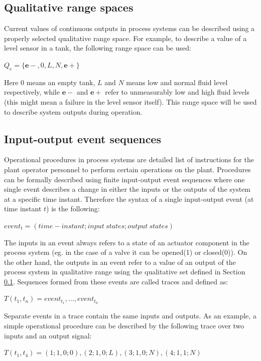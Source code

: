 \documentclass[conference]{IEEEtran}
\begin{document}
\subsection{Qualitative range spaces}
\label{sec:qualrngspc}
Current values of continuous outputs in process systems can be described using a properly selected qualitative range space. For example, to describe a value of a level sensor in a tank, the following range space can be used:

$Q_e=\{\mathbf{e-},0,L,N,\mathbf{e+}\}$

Here $0$ means an empty tank, $L$ and $N$ means low and normal fluid level respectively, while $\mathbf{e-}$ and $\mathbf{e+}$ refer to unmeasurably low and high fluid levels (this might mean a failure in the level sensor itself). This range space will be used to describe system outputs during operation.

\subsection{Input-output event sequences}
\label{sec:ioseq}

Operational procedures in process systems are detailed list of instructions for the plant operator personnel to perform certain operations on the plant. Procedures can be formally described using finite input-output event sequences where one single event describes a change in either the inputs or the outputs of the system at a specific time instant. Therefore the syntax of a single input-output event (at time instant $t$) is the following:

$event_t=(time-instant;{input~states};{output~states})$

The inputs in an event always refers to a state of an actuator component in the process system (eg. in the case of a valve it can be opened(1) or closed(0)). On the other hand, the outputs in an event refer to a value of an output of the process system in qualitative range using the qualitative set defined in Section \ref{sec:qualrngspc}. Sequences formed from these events are called traces and defined as:

$T(t_1,t_n)={event_{t_1},...,event_{t_n}}$

Separate events in a trace contain the same inputs and outputs. As an example, a simple operational procedure can be described by the following trace over two inputs and an output signal:

$T(t_1,t_4)=(1;1,0;0),(2;1,0;L),(3;1,0;N),(4;1,1;N)$
\end{document}
